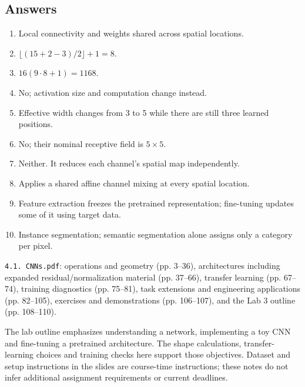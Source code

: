 \documentclass[11pt]{article}
\begin{document}
\subsection{Answers}
\begin{enumerate}
\item Local connectivity and weights shared across spatial locations.
\item $\lfloor(15+2-3)/2\rfloor+1=8$.
\item $16(9\cdot8+1)=1168$.
\item No; activation size and computation change instead.
\item Effective width changes from 3 to 5 while there are still three learned positions.
\item No; their nominal receptive field is $5\times5$.
\item Neither. It reduces each channel's spatial map independently.
\item Applies a shared affine channel mixing at every spatial location.
\item Feature extraction freezes the pretrained representation; fine-tuning updates some of it using target data.
\item Instance segmentation; semantic segmentation alone assigns only a category per pixel.
\end{enumerate}
\texttt{4.1. CNNs.pdf}: operations and geometry (pp. 3--36), architectures including expanded residual/normalization material (pp. 37--66), transfer learning (pp. 67--74), training diagnostics (pp. 75--81), task extensions and engineering applications (pp. 82--105), exercises and demonstrations (pp. 106--107), and the Lab 3 outline (pp. 108--110).

The lab outline emphasizes understanding a network, implementing a toy CNN and fine-tuning a pretrained architecture. The shape calculations, transfer-learning choices and training checks here support those objectives. Dataset and setup instructions in the slides are course-time instructions; these notes do not infer additional assignment requirements or current deadlines.
\end{document}
